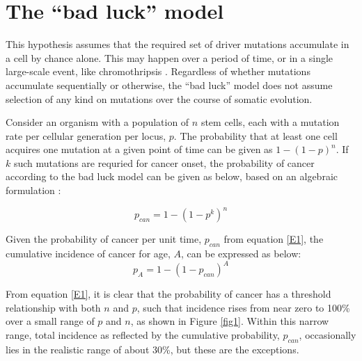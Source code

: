 \documentclass[9pt,twocolumn,twoside]{pnas-new}
\begin{document}
\begin{enumerate}
\end{enumerate}


\section*{The ``bad luck'' model}

This hypothesis assumes that the required set of driver mutations accumulate in a cell by chance alone. This may happen over a period of time, or in a single large-scale event, like chromothripsis \cite{Stephens2011}. Regardless of whether mutations accumulate sequentially or otherwise, the ``bad luck'' model does not assume selection of any kind on mutations over the course of somatic evolution.

Consider an organism with a population of $n$ stem cells, each with a mutation rate per cellular generation per locus, $p$. The probability that at least one cell acquires one mutation at a given point of time can be given as $1-(1-p)^{n}$. If $k$ such mutations are requried for cancer onset, the probability of cancer according to the bad luck model can be given as below, based on an algebraic formulation \cite{Calabrese2010}:

\begin{equation}
	\label{E1}
	p_{can} = 1-(1-p^{k})^{n}
\end{equation}

Given the probability of cancer per unit time, $p_{can}$ from equation \ref{E1}, the cumulative incidence of cancer for age, $A$, can be expressed as below:
\begin{equation}
	\label{E2}
	p_{A} = 1-(1-p_{can})^{A}
\end{equation}

From equation \ref{E1}, it is clear that the probability of cancer has a threshold relationship with both $n$ and $p$, such that incidence rises from near zero to 100\% over a small range of $p$ and $n$, as shown in Figure \ref{fig1}. Within this narrow range, total incidence as reflected by the cumulative probability, $p_{can}$, occasionally lies in the realistic range of about 30\%, but these are the exceptions.
\end{document}
